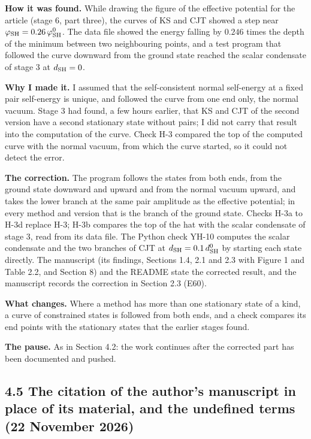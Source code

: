 \documentclass[
  10pt,
]{article}
\begin{document}
\textbf{How it was found.} While drawing the figure of the effective
potential for the article (stage 6, part three), the curves of KS and
CJT showed a step near \(\varphi_{\rm SH}=0.26\,\varphi^0_{\rm SH}\).
The data file showed the energy falling by \(0.246\) times the depth of
the minimum between two neighbouring points, and a test program that
followed the curve downward from the ground state reached the scalar
condensate of stage 3 at \(d_{\rm SH}=0\).

\textbf{Why I made it.} I assumed that the self-consistent normal
self-energy at a fixed pair self-energy is unique, and followed the
curve from one end only, the normal vacuum. Stage 3 had found, a few
hours earlier, that KS and CJT of the second version have a second
stationary state without pairs; I did not carry that result into the
computation of the curve. Check H-3 compared the top of the computed
curve with the normal vacuum, from which the curve started, so it could
not detect the error.

\textbf{The correction.} The program follows the states from both ends,
from the ground state downward and upward and from the normal vacuum
upward, and takes the lower branch at the same pair amplitude as the
effective potential; in every method and version that is the branch of
the ground state. Checks H-3a to H-3d replace H-3; H-3b compares the top
of the hat with the scalar condensate of stage 3, read from its data
file. The Python check YH-10 computes the scalar condensate and the two
branches of CJT at \(d_{\rm SH}=0.1\,d^0_{\rm SH}\) by starting each
state directly. The manuscript (its findings, Sections 1.4, 2.1 and 2.3
with Figure 1 and Table 2.2, and Section 8) and the README state the
corrected result, and the manuscript records the correction in Section
2.3 (E60).

\textbf{What changes.} Where a method has more than one stationary state
of a kind, a curve of constrained states is followed from both ends, and
a check compares its end points with the stationary states that the
earlier stages found.

\textbf{The pause.} As in Section 4.2: the work continues after the
corrected part has been documented and pushed.

\hypertarget{the-citation-of-the-authors-manuscript-in-place-of-its-material-and-the-undefined-terms-22-november-2026}{%
\subsection{4.5 The citation of the author's manuscript in place of its
material, and the undefined terms (22 November
2026)}\label{the-citation-of-the-authors-manuscript-in-place-of-its-material-and-the-undefined-terms-22-november-2026}}
\end{document}
